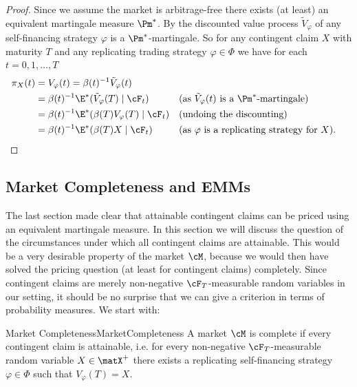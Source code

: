\begin{proof}
	Since we assume the market is arbitrage-free there exists (at least) an equivalent martingale measure \(\Pm^*\). By  the discounted value process \(\tilde{V}_\varphi\) of any self-financing strategy \(\varphi\) is a \(\Pm^*\)-martingale. So for any contingent claim \(X\) with maturity \(T\) and any replicating trading strategy \(\varphi \in \Phi\) we have for each \(t = 0, 1, \dots, T\)
	\begin{equation}
		\begin{aligned}
			\pi_X(t) & = V_\varphi(t) = \beta(t)^{-1} \tilde{V}_\varphi(t)                                                                                 \\
			         & = \beta(t)^{-1} \E^*(\tilde{V}_\varphi(T) \mid \cF_t)  &  & (\text{as } \tilde{V}_\varphi(t) \text{ is a } \Pm^*\text{-martingale}) \\
			         & = \beta(t)^{-1} \E^*(\beta(T) V_\varphi(T) \mid \cF_t) &  & (\text{undoing the discounting})                                        \\
			         & = \beta(t)^{-1} \E^*(\beta(T)X \mid \cF_t)             &  & (\text{as } \varphi \text{ is a replicating strategy for } X).
		\end{aligned}
	\end{equation}
\end{proof}

\subsection{Market Completeness and EMMs}

The last section made clear that attainable contingent claims can be priced using an equivalent martingale measure. In this section we will discuss the question of the circumstances under which all contingent claims are attainable. This would be a very desirable property of the market \(\cM\), because we would then have solved the pricing question (at least for contingent claims) completely. Since contingent claims are merely non-negative \(\cF_T\)-measurable random variables in our setting, it should be no surprise that we can give a criterion in terms of probability measures. We start with:

\begin{defn}{Market Completeness}{MarketCompleteness}
	A market \(\cM\) is complete if every contingent claim is attainable, i.e. for every non-negative \(\cF_T\)-measurable random variable \(X \in \matX^+\) there exists a replicating self-financing strategy \(\varphi \in \Phi\) such that \(V_\varphi(T) = X\).
\end{defn}

